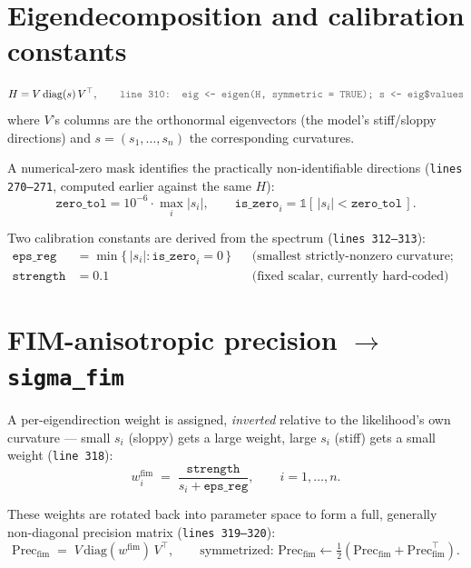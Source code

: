 \documentclass[11pt]{article}
\newcommand{\code}[1]{\texttt{#1}}
\newcommand{\file}[1]{\textcolor{black!60}{\texttt{#1}}}
\begin{document}
\section{Eigendecomposition and calibration constants}

\begin{equation}
  H = V\, \mathrm{diag}(s)\, V^\top,
  \qquad
  \file{line 310: \code{eig <- eigen(H, symmetric = TRUE); s <- eig\$values}}
\end{equation}
where $V$'s columns are the orthonormal eigenvectors (the model's
stiff/sloppy directions) and $s = (s_1,\ldots,s_n)$ the corresponding
curvatures.

A numerical-zero mask identifies the practically non-identifiable directions
(\file{lines 270--271}, computed earlier against the same $H$):
\begin{equation}
  \texttt{zero\_tol} = 10^{-6}\cdot\max_i|s_i|,
  \qquad
  \texttt{is\_zero}_i = \mathbb{1}\!\left[\,|s_i| < \texttt{zero\_tol}\,\right].
\end{equation}

Two calibration constants are derived from the spectrum (\file{lines
312--313}):
\begin{align}
  \texttt{eps\_reg} &= \min\big\{\, |s_i| : \texttt{is\_zero}_i = 0 \,\big\}
  && \text{(smallest strictly-nonzero curvature; a floor)} \\
  \texttt{strength} &= 0.1
  && \text{(fixed scalar, currently hard-coded)}
\end{align}

\section{FIM-anisotropic precision $\to$ \code{sigma\_fim}}

A per-eigendirection weight is assigned, \emph{inverted} relative to the
likelihood's own curvature --- small $s_i$ (sloppy) gets a large weight,
large $s_i$ (stiff) gets a small weight (\file{line 318}):
\begin{equation}
  w^{\mathrm{fim}}_i \;=\; \frac{\texttt{strength}}{s_i + \texttt{eps\_reg}},
  \qquad i = 1,\ldots,n.
\end{equation}

These weights are rotated back into parameter space to form a full,
generally non-diagonal precision matrix (\file{lines 319--320}):
\begin{equation}
  \mathrm{Prec}_{\mathrm{fim}} \;=\; V\, \mathrm{diag}(w^{\mathrm{fim}})\, V^\top,
  \qquad \text{symmetrized: } \mathrm{Prec}_{\mathrm{fim}} \leftarrow
  \tfrac{1}{2}\!\left(\mathrm{Prec}_{\mathrm{fim}} + \mathrm{Prec}_{\mathrm{fim}}^\top\right).
\end{equation}
\end{document}
